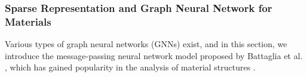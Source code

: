 

\subsubsection{Sparse Representation and Graph Neural Network for Materials}
    Various types of graph neural networks (GNNs) exist, and in this section, we introduce the message-passing neural network model proposed by Battaglia et al. \cite{1806.01261}, which has gained popularity in the analysis of material structures \cite{chen2019graph}.
    
